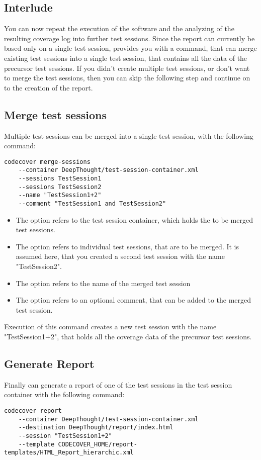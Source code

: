\subsection{Interlude}
You can now repeat the execution of the software and the analyzing of the resulting coverage log into further test sessions. Since the report can currently be based only on a single test session, provides \codecover you with a command, that can merge existing test sessions into a single test session, that contains all the data of the precursor test sessions. If you didn't create multiple test sessions, or don't want to merge the test sessions, then you can skip the following step and continue on to the creation of the report.

\subsection{Merge test sessions}
Multiple test sessions can be merged into a single test session, with the following command:
\begin{verbatim}
codecover merge-sessions 
    --container DeepThought/test-session-container.xml 
    --sessions TestSession1 
    --sessions TestSession2 
    --name "TestSession1+2" 
    --comment "TestSession1 and TestSession2" 
\end{verbatim}
\begin{itemize}
\item The option  refers to the test session container, which holds the to be merged test sessions.
\item The option  refers to individual test sessions, that are to be merged. It is assumed here, that you created a second test session with the name "TestSession2".
\item The option  refers to the name of the merged test session
\item The option  refers to an optional comment, that can be added to the merged test session.
\end{itemize}
Execution of this command creates a new test session with the name "TestSession1+2", that holds all the coverage data of the precursor test sessions.

\subsection{Generate Report}
Finally \codecover can generate a report of one of the test sessions in the test session container with the following command:
\begin{verbatim}
codecover report 
    --container DeepThought/test-session-container.xml 
    --destination DeepThought/report/index.html 
    --session "TestSession1+2" 
    --template CODECOVER_HOME/report-templates/HTML_Report_hierarchic.xml 
\end{verbatim}


